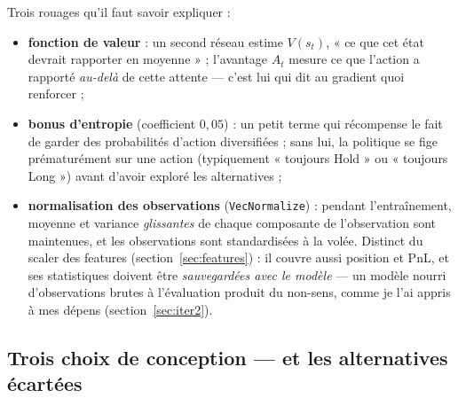 \documentclass[11pt,a4paper]{article}
\newcommand{\code}[1]{\texttt{#1}}
\begin{document}
Trois rouages qu'il faut savoir expliquer :
\begin{itemize}[itemsep=2pt]
  \item \textbf{fonction de valeur} : un second réseau estime $V(s_t)$, « ce que cet
        état devrait rapporter en moyenne » ; l'avantage $A_t$ mesure ce que l'action a
        rapporté \emph{au-delà} de cette attente --- c'est lui qui dit au gradient quoi
        renforcer ;
  \item \textbf{bonus d'entropie} (coefficient $0{,}05$) : un petit terme qui récompense
        le fait de garder des probabilités d'action diversifiées ; sans lui, la
        politique se fige prématurément sur une action (typiquement « toujours Hold »
        ou « toujours Long ») avant d'avoir exploré les alternatives ;
  \item \textbf{normalisation des observations} (\code{VecNormalize}) : pendant
        l'entraînement, moyenne et variance \emph{glissantes} de chaque composante de
        l'observation sont maintenues, et les observations sont standardisées à la
        volée. Distinct du scaler des features (section~\ref{sec:features}) : il couvre
        aussi position et PnL, et ses statistiques doivent être \emph{sauvegardées avec
        le modèle} --- un modèle nourri d'observations brutes à l'évaluation produit du
        non-sens, comme je l'ai appris à mes dépens (section~\ref{sec:iter2}).
\end{itemize}

\subsection{Trois choix de conception --- et les alternatives écartées}
\end{document}
